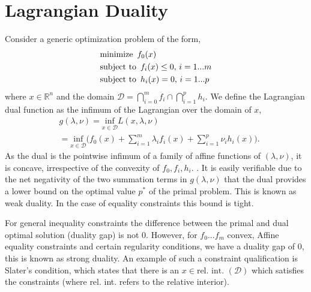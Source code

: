 \documentclass[journal]{IEEEtran}
\begin{document}
	\section{Lagrangian Duality}
	Consider a generic optimization problem of the form,
	\begin{equation}
	\begin{aligned}
	&\text{minimize } \thinspace f_{0}(x)\\
	&\text{subject to } \thinspace f_{i}(x) \leq 0, \thinspace i=1...m\\
	&\text{subject to } \thinspace h_{i}(x) = 0, \thinspace i=1...p
	\end{aligned}
	\end{equation}
	where $x \in \mathbb{R}^{n}$ and the domain $\mathcal{D} = \bigcap\limits_{i=0}^{m} f_{i}\cap\bigcap\limits_{i=1}^{p}h_{i}$. We define the Lagrangian dual function as the infimum of the Lagrangian over the domain of $x$,
	\begin{equation}
	\begin{aligned}
	& g(\lambda,\nu) = \underset{x \in \mathcal{D}}{\mbox{inf}}L(x,\lambda, \nu)\\
	& = \underset{x \in \mathcal{D}}{\mbox{inf}}\bigg( f_{0}(x) + \sum_{i=1}^{m}\lambda_{i}f_{i}(x) + \sum_{i=1}^{p}\nu_{i}h_{i}(x)\bigg).
	\end{aligned}
	\end{equation}
	As the dual is the pointwise infimum of a family of affine functions of $(\lambda, \nu)$, it is concave, irrespective of the convexity of $f_{0},f_{i},h_{i}$. \cite{boyd_vandenberghe_2009}. It is easily verifiable due to the net negativity of the two summation terms in $g(\lambda, \nu)$ that the dual provides a lower bound on the optimal value $p^{*}$ of the primal problem. This is known as weak duality. In the case of equality constraints this bound is tight. 
	
	For general inequality constraints the difference between the primal and dual optimal solution (duality gap) is not 0. However, for $f_{0}...f_{m}$ convex, Affine equality constraints and certain regularity conditions, we have a duality gap of $0$, this is known as strong duality. An example of such a constraint qualification is Slater's condition, which states that there is an $x \in \mbox{rel. int. } (\mathcal{D})$ which satisfies the constraints (where rel. int. refers to the relative interior).
\end{document}
